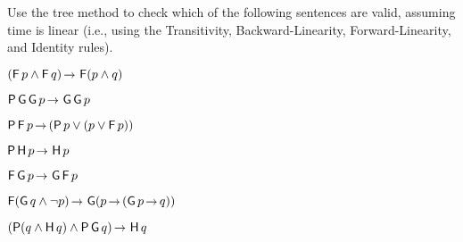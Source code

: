 \begin{exercise}
  Use the tree method to check which of the following sentences are valid,
  assuming time is linear (i.e., using the Transitivity, Backward-Linearity,
  Forward-Linearity, and Identity rules).
  \begin{exlist}
  \item $(\tF p \land \tF q) \to \tF(p \land q)$
  \item $\tP\tG\tG p \to \tG\tG p$
  \item $\tP\tF p \to (\tP p \lor (p \lor \tF p))$
  \item $\tP\tH p \to \tH p$
  \item $\tF\tG p \to \tG\tF p$
  \item $\tF (\tG q \land \neg p) \to \tG(p \to (\tG p \to q))$ 
  \item $(\tP(q \land \tH q) \land \tP\tG q) \to \tH q$
  \end{exlist}
\end{exercise}
